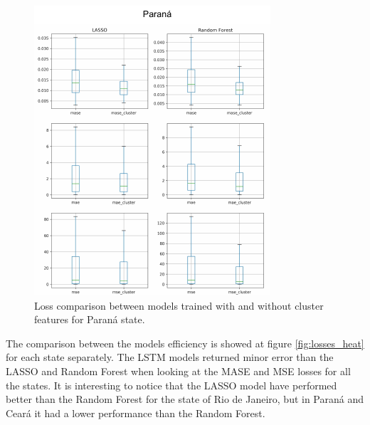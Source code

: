 \documentclass[12pt]{report}
\begin{document}
\begin{figure}[!ht]
\centering
\includegraphics[width=\textwidth]{cluster_model_compar_PR.pdf}
\caption{Loss comparison between models trained with and without cluster features for Paraná state.}
\label{fig:cluster_compar_pr}
\end{figure}

The comparison between the models efficiency is showed at figure \ref{fig:losses_heat} for each state separately. The LSTM models returned minor error than the LASSO and Random Forest when looking at the MASE and MSE losses for all the states. It is interesting to notice that the LASSO model have performed better than the Random Forest for the state of Rio de Janeiro, but in Paraná and Ceará it had a lower performance than the Random Forest.
\end{document}
